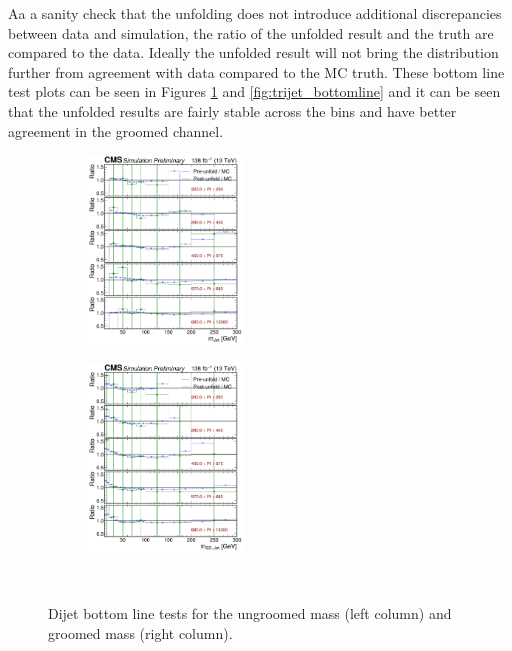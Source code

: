       Aa a sanity check that the unfolding does not introduce additional discrepancies between data and simulation, the ratio of the unfolded result and the truth are compared to the data. Ideally the unfolded result will not bring the distribution further from agreement with data compared to the MC truth. These bottom line test plots can be seen in Figures \ref{fig:dijet_bottomline} and \ref{fig:trijet_bottomline} and it can be seen that the unfolded results are fairly stable across the bins and have better agreement in the groomed channel.
        \begin{figure}[htp!]
        \begin{subfigure}
          \centering
          \includegraphics[width=0.45\textwidth]{figures/multijet/unfolding/dijet/biastest_u.pdf}
        \end{subfigure} 
        \begin{subfigure}
          \centering
          \includegraphics[width=0.45\textwidth]{figures/multijet/unfolding/dijet/biastest_g.pdf}
        \end{subfigure} \\
	\caption{Dijet bottom line tests for the ungroomed mass (left column) and groomed mass (right column).}
	\label{fig:dijet_bottomline}
      \end{figure}
